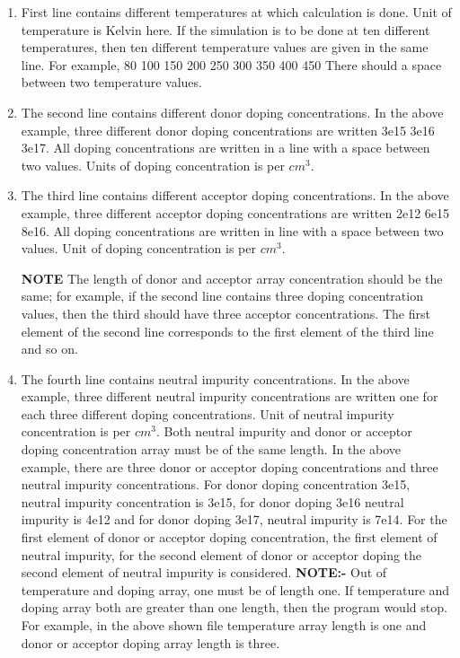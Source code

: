 \documentclass[12pt]{article}
\begin{document}
\begin{enumerate}
\begin{enumerate}[label=\Roman*]
\item First line contains different temperatures at which calculation is done. Unit of temperature is Kelvin here. If the simulation is to be done at ten different temperatures, then ten different temperature values are given in the same line. For example, 
 80 100 150 200 250 300 350 400 450
\newline There should a space between two temperature values.

\item The second line contains different donor doping concentrations. In the above example, three different donor doping concentrations are written 3e15 3e16 3e17. All doping concentrations are written in a line with a space between two values. Units of doping concentration is per $cm^3$.

\item The third line contains different acceptor doping concentrations. In the above example, three different acceptor doping concentrations are written 2e12 6e15 8e16. All doping concentrations are written in line with a space between two values. Unit of doping concentration is per $cm^3$. 

\textbf{NOTE} The length of donor and acceptor array concentration should be the same; for example, if the second line contains three doping concentration values, then the third should have three acceptor concentrations. The first element of the second line corresponds to the first element of the third line and so on.

\item The fourth line contains neutral impurity concentrations. In the above example, three different neutral impurity concentrations are written one for each three different doping concentrations. Unit of neutral impurity concentration is per $cm^3$. Both neutral impurity and donor or acceptor doping concentration array must be of the same length. In the above example, there are three donor or acceptor doping concentrations and three neutral impurity concentrations. For donor doping concentration 3e15, neutral impurity concentration is 3e15, for donor doping 3e16 neutral impurity is 4e12 and for donor doping 3e17, neutral impurity is 7e14. For the first element of donor or acceptor doping concentration, the first element of neutral impurity, for the second element of donor or acceptor doping the second element of neutral impurity is considered.
\newline \textbf{NOTE:-} Out of temperature and doping array, one must be of length one. If temperature and doping array both are greater than one length, then the program would stop. For example, in the above shown file temperature array length is one and donor or acceptor doping array length is three. 


\end{enumerate}
\end{enumerate}
\end{document}
